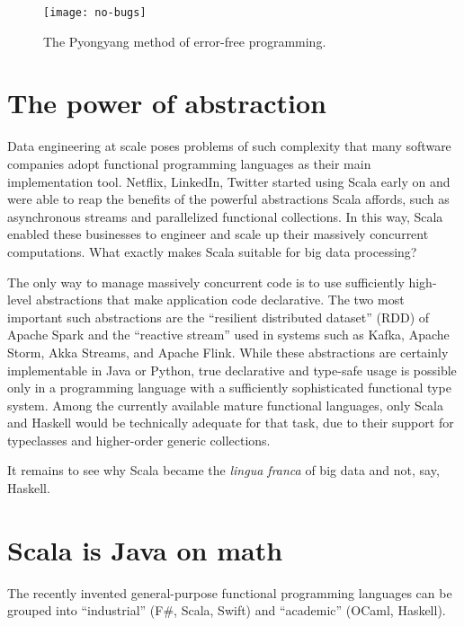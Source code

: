 \begin{figure}
\begin{centering}
\texttt{[image: no-bugs]}
\par\end{centering}
\caption{The Pyongyang method of error-free programming.}
\label{code-without-bugs}
\end{figure}


\section{The power of abstraction}

Data engineering at scale poses problems of such complexity that many
software companies adopt functional programming languages as their
main implementation tool. Netflix, LinkedIn, Twitter started using
Scala early on and were able to reap the benefits of the powerful
abstractions Scala affords, such as asynchronous streams and parallelized
functional collections. In this way, Scala enabled these businesses
to engineer and scale up their massively concurrent computations.
What exactly makes Scala suitable for big data processing?

The only way to manage massively concurrent code is to use sufficiently
high-level abstractions that make application code declarative. The
two most important such abstractions are the ``resilient distributed
dataset'' (RDD) of Apache Spark and the ``reactive stream'' used
in systems such as Kafka, Apache Storm, Akka Streams, and Apache Flink.
While these abstractions are certainly implementable in Java or Python,
true declarative and type-safe usage is possible only in a programming
language with a sufficiently sophisticated functional type system.
Among the currently available mature functional languages, only Scala
and Haskell would be technically adequate for that task, due to their
support for typeclasses and higher-order generic collections.

It remains to see why Scala became the \emph{lingua franca} of big
data and not, say, Haskell.

\section{Scala is Java on math }

The recently invented general-purpose functional programming languages
can be grouped into ``industrial'' (F\#, Scala, Swift) and ``academic''
(OCaml, Haskell).

